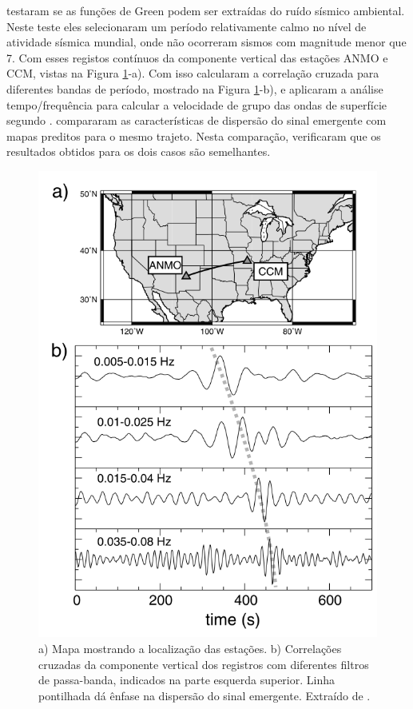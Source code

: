 \cite{shapiro_emergence_2004} testaram se as funções de Green podem ser extraídas do ruído sísmico ambiental. Neste teste eles selecionaram um
período relativamente calmo no nível de atividade sísmica mundial, onde não ocorreram sismos com magnitude menor que 7. Com esses registos contínuos da componente vertical das estações ANMO e CCM, vistas na Figura \ref{shapiro}-a). Com isso calcularam a correlação cruzada para diferentes bandas de período, mostrado na Figura \ref{shapiro}-b), e aplicaram a análise tempo/frequência para calcular a velocidade de grupo das ondas de superfície segundo \cite{levshin_automated_2001}. \cite{shapiro_emergence_2004}  compararam as características de dispersão do sinal emergente com mapas preditos para o mesmo trajeto.  Nesta comparação, verificaram que os resultados obtidos para os dois casos são semelhantes.

\begin{figure}[!ht]
\centering
\includegraphics[scale=0.7]{Figs/shapiro2004.png}
\caption{a) Mapa mostrando a localização das estações. b) Correlações cruzadas da componente vertical dos registros com diferentes filtros de passa-banda, indicados na parte esquerda superior. Linha pontilhada dá ênfase na dispersão do sinal emergente. Extraído de \cite{shapiro_emergence_2004}.}
\label{shapiro}
\end{figure} 

